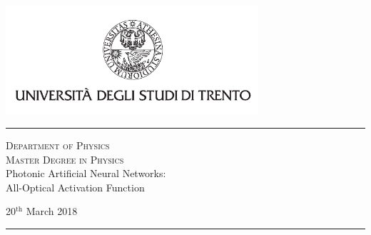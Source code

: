 \begin{titlepage}
\begin{center}

\includegraphics[width=0.7\textwidth]{figures/unitn_logo}
\vspace{3em}

\hrule
\vspace{2em}
{\LARGE \textsc{Department of Physics} \\}
\vspace{1em}
{\LARGE \textsc{Master Degree in Physics} \\}
\vfill
{ \huge %
	Photonic Artificial Neural Networks:\\
	\vspace{0.5em}
	\LARGE %
	All-Optical Activation Function
}
\vfill

\begin{parcolumns}{2}
\end{parcolumns}

\vspace*{3em}
\large 20$^\text{th}$ March 2018\\[0.1cm]
\hrule

\end{center}
\end{titlepage}